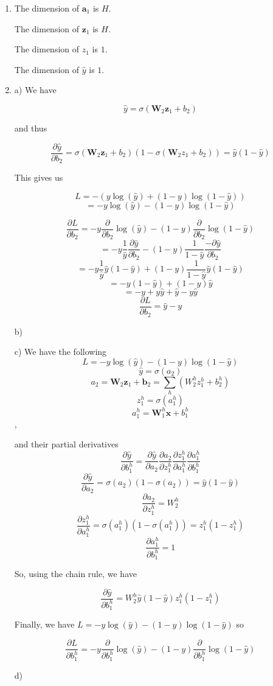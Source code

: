 \documentclass[submit]{harvardml}
\begin{document}
\begin{enumerate}

\item 
The dimension of $\mathbf{a}_1$ is $H$.

The dimension of $\mathbf{z}_1$ is $H$.

The dimension of $z_1$ is $1$.

The dimension of $\hat{y}$ is $1$.

\item

a)
We have 

$$\hat{y} = \sigma(\mathbf{W}_2 \mathbf{z}_1 + b_2)$$

and thus

$$ \frac{\partial\hat{y}}{\partial b_2} = \sigma(\mathbf{W}_2 \mathbf{z}_1 + b_2)(1-\sigma(\mathbf{W}_2 z_1 + b_2)) = \hat{y}(1 - \hat{y})$$

This gives us 

$$L = -(y \log (\hat{y}) + (1 - y) \log (1 - \hat{y}))$$
$$= -y \log (\hat{y}) - (1 - y) \log (1 - \hat{y})$$

$$\frac{\partial L}{\partial b_2} = -y \frac{\partial}{\partial b_2} \log (\hat{y}) - (1 - y) \frac{\partial}{\partial b_2}\log (1 - \hat{y})$$
$$ = -y \frac{1}{\hat{y}} \frac{\partial \hat{y}}{\partial b_2} - (1 - y) \frac{1}{1 - \hat{y}} \frac{-\partial \hat{y}}{\partial b_2}$$
$$ = -y \frac{1}{\hat{y}}  \hat{y}(1 - \hat{y}) + (1 - y) \frac{1}{1 - \hat{y}}  \hat{y}(1 - \hat{y})$$
$$ = -y (1 - \hat{y}) + (1 - y)   \hat{y}$$
$$ = -y + y\hat{y} + \hat{y} - y\hat{y}$$
$$ \boxed{\frac{\partial L}{\partial b_2} = \hat{y}-y} $$

b)


c) We have the following
$$L = -y \log (\hat{y}) - (1 - y) \log (1 - \hat{y})$$
$$\hat{y}=\sigma(a_2)$$
$$a_2=\mathbf{W}_2\mathbf{z}_1+\mathbf{b}_2=\sum_h (W_2^h z_1^h + b_2^h)$$
$$z^h_1=\sigma(a^h_1)$$
 $$a^h_1=\mathbf{W}^h_1\mathbf{x}+b^h_1$$,
 
and their partial derivatives
$$\frac{\partial\hat{y}}{\partial b_1^h}=\frac{\partial\hat{y}}{\partial a_2}\frac{\partial a_2}{\partial z_1^h}\frac{\partial z_1^h}{\partial a_1^h} \frac{\partial a_1^h}{\partial b_1^h}$$
$$\frac{\partial\hat{y}}{\partial a_2}=\sigma(a_2)(1-\sigma(a_2))=\hat{y}(1-\hat{y})$$
$$\frac{\partial a_2}{\partial z_1^h} = W_2^h$$
$$\frac{\partial z^h_1}{\partial a_1^h} = \sigma(a_1^h)(1-\sigma(a_1^h))=z_1^h(1-z_1^h)$$
$$\frac{\partial a_1^h}{\partial b_1^h} = 1$$

So, using the chain rule, we have

$$\frac{\partial\hat{y}}{\partial b_1^h} = W_2^h \hat{y}(1-\hat{y}) z_1^h(1-z_1^h)$$

Finally, we have $L = -y \log (\hat{y}) - (1 - y) \log (1 - \hat{y})$ so

$$\frac{\partial L}{\partial b_1^h} = -y \frac{\partial}{\partial b_1^h}\log (\hat{y}) - (1 - y)\frac{\partial}{\partial b_1^h} \log (1 - \hat{y})$$


d)

\end{enumerate}
\end{document}
